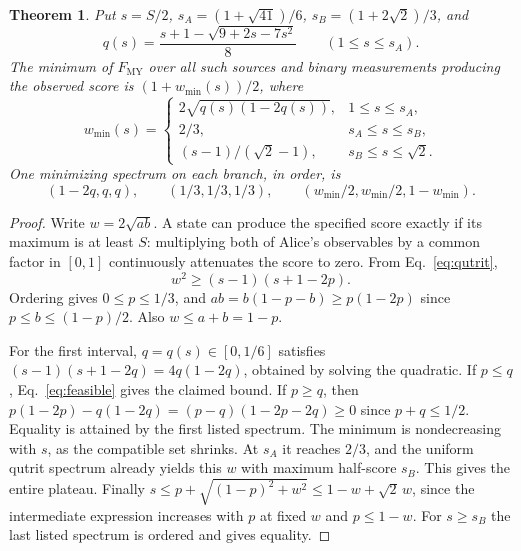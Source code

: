\documentclass[11pt]{article}
\newtheorem{theorem}{Theorem}[section]
\newcommand{\MY}{F_{\mathrm{MY}}}
\begin{document}
\begin{theorem}\label{th:frontier}
Put $s=S/2$, $s_A=(1+\sqrt{41})/6$, $s_B=(1+2\sqrt2)/3$, and
\[
 q(s)=\frac{s+1-\sqrt{9+2s-7s^2}}{8}\qquad(1\le s\le s_A).
\]
The minimum of $\MY$ over all such sources and binary measurements producing the observed score is $(1+w_{\min}(s))/2$, where
\begin{equation}
 w_{\min}(s)=
 \begin{cases}
 2\sqrt{q(s)(1-2q(s))},&1\le s\le s_A,\\[2pt]
 2/3,&s_A\le s\le s_B,\\[2pt]
 (s-1)/(\sqrt2-1),&s_B\le s\le\sqrt2.
 \end{cases}                                                   \label{eq:frontier}
\end{equation}
One minimizing spectrum on each branch, in order, is
\[
 (1-2q,q,q),\qquad (1/3,1/3,1/3),\qquad (w_{\min}/2,w_{\min}/2,1-w_{\min}).
\]
\end{theorem}
\begin{proof}
Write $w=2\sqrt{ab}$. A state can produce the specified score exactly if its maximum is at least $S$: multiplying both of Alice's observables by a common factor in $[0,1]$ continuously attenuates the score to zero. From Eq.~\eqref{eq:qutrit},
\begin{equation}
    w^2\ge (s-1)(s+1-2p).                                     \label{eq:feasible}
\end{equation}
Ordering gives $0\le p\le1/3$, and $ab=b(1-p-b)\ge p(1-2p)$ since $p\le b\le(1-p)/2$. Also $w\le a+b=1-p$.

For the first interval, $q=q(s)\in[0,1/6]$ satisfies $(s-1)(s+1-2q)=4q(1-2q)$, obtained by solving the quadratic. If $p\le q$, Eq.~\eqref{eq:feasible} gives the claimed bound. If $p\ge q$, then
$p(1-2p)-q(1-2q)=(p-q)(1-2p-2q)\ge0$ since $p+q\le1/2$. Equality is attained by the first listed spectrum. The minimum is nondecreasing with $s$, as the compatible set shrinks. At $s_A$ it reaches $2/3$, and the uniform qutrit spectrum already yields this $w$ with maximum half-score $s_B$. This gives the entire plateau. Finally $s\le p+\sqrt{(1-p)^2+w^2}\le 1-w+\sqrt2\,w$, since the intermediate expression increases with $p$ at fixed $w$ and $p\le1-w$. For $s\ge s_B$ the last listed spectrum is ordered and gives equality.
\end{proof}
\end{document}
